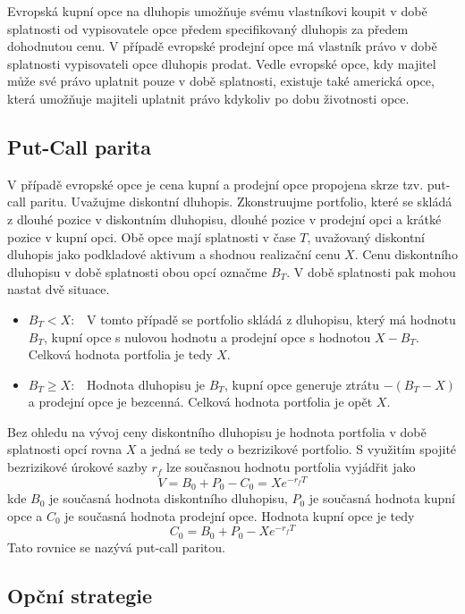 \documentclass[a4paper]{book}
\begin{document}
Evropská kupní opce na dluhopis umožňuje svému vlastníkovi koupit v době splatnosti od vypisovatele opce předem specifikovaný dluhopis za předem dohodnutou cenu. V případě evropské prodejní opce má vlastník právo v době splatnosti vypisovateli opce dluhopis prodat. Vedle evropské opce, kdy majitel může své právo uplatnit pouze v době splatnosti, existuje také americká opce, která umožňuje majiteli uplatnit právo kdykoliv po dobu životnosti opce.

\subsection{Put-Call parita}

V případě evropské opce je cena kupní a prodejní opce propojena skrze tzv. put-call paritu. Uvažujme diskontní dluhopis. Zkonstruujme portfolio, které se skládá z dlouhé pozice v diskontním dluhopisu, dlouhé pozice v prodejní opci a krátké pozice v kupní opci. Obě opce mají splatnosti v čase $T$, uvažovaný diskontní dluhopis jako podkladové aktivum a shodnou realizační cenu $X$. Cenu diskontního dluhopisu v době splatnosti obou opcí označme $B_T$. V době splatnosti pak mohou nastat dvě situace.
\begin{itemize}
\item $B_T < X$:~~V tomto případě se portfolio skládá z dluhopisu, který má hodnotu $B_T$, kupní opce s nulovou hodnotu a prodejní opce s hodnotou $X - B_T$. Celková hodnota portfolia je tedy $X$.
\item  $B_T \ge X$:~~Hodnota dluhopisu je $B_T$, kupní opce generuje ztrátu $-(B_T - X)$ a prodejní opce je bezcenná. Celková hodnota portfolia je opět $X$.
\end{itemize}
Bez ohledu na vývoj ceny diskontního dluhopisu je hodnota portfolia v době splatnosti opcí rovna $X$ a jedná se tedy o bezrizikové portfolio. S využitím spojité bezrizikové úrokové sazby $r_f$ lze současnou hodnotu portfolia vyjádřit jako
\begin{equation*}
V = B_0 + P_0 - C_0 = Xe^{-r_fT}
\end{equation*}
kde $B_0$ je současná hodnota diskontního dluhopisu, $P_0$ je současná hodnota kupní opce a $C_0$ je současná hodnota prodejní opce. Hodnota kupní opce je tedy
\begin{equation*}
C_0 = B_0 + P_0 - Xe^{-r_fT}
\end{equation*}
Tato rovnice se nazývá put-call paritou.

\subsection{Opční strategie}
\end{document}
